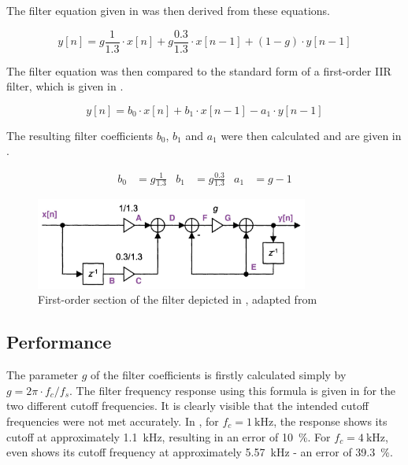 \documentclass[a4paper, 12pt]{article}
\begin{document}
The filter equation given in   was then derived from these equations.

\begin{equation}
	\label{eq:filter}
	y[n] = g \frac{1}{1.3} \cdot x[n] +
	g \frac{0.3}{1.3} \cdot x[n-1] +
	(1-g) \cdot y[n-1]
\end{equation}

The filter equation was then compared to the standard form of a first-order IIR filter, which is given in .

\begin{equation}
	\label{eq:first-order-iir}
	y[n] = b_0 \cdot x[n] + 
	b_1 \cdot x[n-1] - 
	a_1 \cdot y[n-1]
\end{equation}

The resulting filter coefficients $b_0$, $b_1$ and $a_1$ were then calculated and are given in .

\begin{align}
	\label{eq:coefficients}
	b_0 &= g \frac{1}{1.3} &
	b_1 &= g \frac{0.3}{1.3} &
	a_1 &= g - 1
\end{align}

\begin{figure}
	\centering
	\includegraphics[width=0.8\textwidth]{first-order-section.jpg}
	\caption{First-order section of the filter depicted in , adapted from \cite{Vaelimaeki2006}}
	\label{fig:first-order-section}
\end{figure}

\subsection{Performance}

The parameter $g$ of the filter coefficients is firstly calculated simply by $g = 2 \pi \cdot f_c / f_s$. The filter frequency response using this formula is given in  for the two different cutoff frequencies. It is clearly visible that the intended cutoff frequencies were not met accurately. In , for $f_c = \SI{1}{\kilo\hertz}$, the response shows its cutoff at approximately \SI{1.1}{\kilo\hertz}, resulting in an error of \SI{10}{\percent}. For $f_c = \SI{4}{\kilo\hertz}$,  even shows its cutoff frequency at approximately \SI{5.57}{\kilo\hertz} - an error of \SI{39.3}{\percent}.
\end{document}
